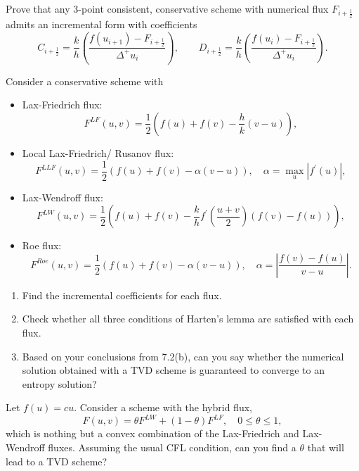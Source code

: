 \documentclass{article}
\newcommand{\iph}{{i + \frac{1}{2}}}
\begin{document}
\begin{exerciseList}

\item Prove that any 3-point consistent, conservative scheme with numerical flux $F_\iph$ admits an incremental form with coefficients
\[
C_\iph = \frac{k}{h} \left(\frac{f(u_{i+1}) - F_\iph}{\Delta^+u_i} \right), \qquad D_\iph = \frac{k}{h} \left(\frac{f(u_{i}) - F_\iph}{\Delta^+u_i}\right).
\]


\item
Consider a conservative scheme with
\begin{itemize}
\item Lax-Friedrich flux:
\[
F^{LF}(u,v)= \frac{1}{2} \left( f(u) + f(v) - \frac{h}{k} (v-u)\right),
\]
\item Local Lax-Friedrich/ Rusanov flux:
\[
F^{LLF}(u,v)= \frac{1}{2} \left( f(u) + f(v) - \alpha (v-u)\right), \quad \alpha = \max_u|f^\prime(u)|,
\]
\item Lax-Wendroff flux:
\[
F^{LW}(u,v)= \frac{1}{2} \left( f(u) + f(v) - \frac{k}{h} f^\prime\left( \frac{u+v}{2}\right)(f(v) - f(u))\right),
\]
\item Roe flux:
\[
F^{Roe}(u,v)= \frac{1}{2} \left( f(u) + f(v) - \alpha (v-u)\right), \quad \alpha = \left|\frac{f(v) -f(u)}{v-u}\right|.
\]
\end{itemize}
\begin{enumerate}
\item Find the incremental coefficients for each flux. 
\item Check whether all three conditions of Harten's lemma are satisfied with each flux.
\item Based on your conclusions from 7.2(b), can you say whether the numerical solution obtained with a TVD scheme is guaranteed to converge to an entropy solution?
\end{enumerate}

\item
Let $f(u) = c u$. Consider a scheme with the hybrid flux,
\[
F(u,v) = \theta F^{LW} + (1-\theta) F^{LF}, \quad 0 \leq \theta \leq 1,
\]
which is nothing but a convex combination of the Lax-Friedrich and Lax-Wendroff fluxes. Assuming the usual CFL condition, can you find a $\theta$ that will lead to a TVD scheme?




\end{exerciseList}
\end{document}
